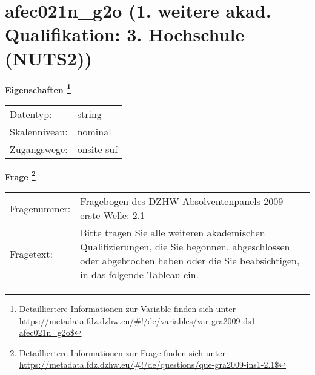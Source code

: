 
    \setcounter{footnote}{0}

    \vspace*{-1.8cm}
	\section{afec021n\_g2o (1. weitere akad. Qualifikation: 3. Hochschule (NUTS2))}
	\label{section:afec021n_g2o}



    \vspace*{0.5cm}
    \noindent\textbf{Eigenschaften
	\footnote{Detailliertere Informationen zur Variable finden sich unter
		\url{https://metadata.fdz.dzhw.eu/\#!/de/variables/var-gra2009-ds1-afec021n_g2o$}}}\\
	\begin{tabularx}{\hsize}{@{}lX}
	Datentyp: & string \\
	Skalenniveau: & nominal \\
	Zugangswege: &
	  onsite-suf
 \\
    \end{tabularx}



				\vspace*{0.5cm}
                \noindent\textbf{Frage
	                \footnote{Detailliertere Informationen zur Frage finden sich unter
		              \url{https://metadata.fdz.dzhw.eu/\#!/de/questions/que-gra2009-ins1-2.1$}}}\\
				\begin{tabularx}{\hsize}{@{}lX}
					Fragenummer: &
					  Fragebogen des DZHW-Absolventenpanels 2009 - erste Welle:
					  2.1
 \\
					Fragetext: & Bitte tragen Sie alle weiteren akademischen Qualifizierungen, die Sie begonnen, abgeschlossen oder abgebrochen haben oder die Sie beabsichtigen, in das folgende Tableau ein. \\
				\end{tabularx}





